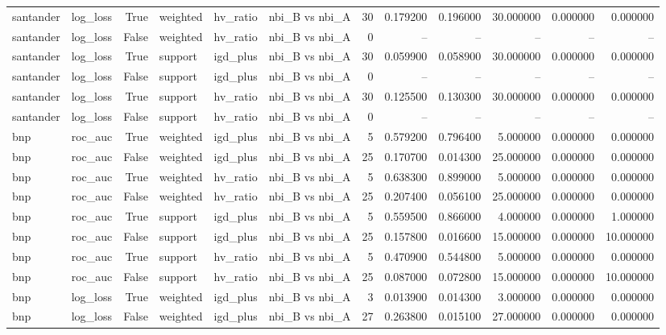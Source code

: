 \begin{longtable}{llrlllrrrrrr}
santander & log\_loss & True & weighted & hv\_ratio & nbi\_B vs nbi\_A & 30 & 0.179200 & 0.196000 & 30.000000 & 0.000000 & 0.000000 \\
santander & log\_loss & False & weighted & hv\_ratio & nbi\_B vs nbi\_A & 0 & -- & -- & -- & -- & -- \\
santander & log\_loss & True & support & igd\_plus & nbi\_B vs nbi\_A & 30 & 0.059900 & 0.058900 & 30.000000 & 0.000000 & 0.000000 \\
santander & log\_loss & False & support & igd\_plus & nbi\_B vs nbi\_A & 0 & -- & -- & -- & -- & -- \\
santander & log\_loss & True & support & hv\_ratio & nbi\_B vs nbi\_A & 30 & 0.125500 & 0.130300 & 30.000000 & 0.000000 & 0.000000 \\
santander & log\_loss & False & support & hv\_ratio & nbi\_B vs nbi\_A & 0 & -- & -- & -- & -- & -- \\
bnp & roc\_auc & True & weighted & igd\_plus & nbi\_B vs nbi\_A & 5 & 0.579200 & 0.796400 & 5.000000 & 0.000000 & 0.000000 \\
bnp & roc\_auc & False & weighted & igd\_plus & nbi\_B vs nbi\_A & 25 & 0.170700 & 0.014300 & 25.000000 & 0.000000 & 0.000000 \\
bnp & roc\_auc & True & weighted & hv\_ratio & nbi\_B vs nbi\_A & 5 & 0.638300 & 0.899000 & 5.000000 & 0.000000 & 0.000000 \\
bnp & roc\_auc & False & weighted & hv\_ratio & nbi\_B vs nbi\_A & 25 & 0.207400 & 0.056100 & 25.000000 & 0.000000 & 0.000000 \\
bnp & roc\_auc & True & support & igd\_plus & nbi\_B vs nbi\_A & 5 & 0.559500 & 0.866000 & 4.000000 & 0.000000 & 1.000000 \\
bnp & roc\_auc & False & support & igd\_plus & nbi\_B vs nbi\_A & 25 & 0.157800 & 0.016600 & 15.000000 & 0.000000 & 10.000000 \\
bnp & roc\_auc & True & support & hv\_ratio & nbi\_B vs nbi\_A & 5 & 0.470900 & 0.544800 & 5.000000 & 0.000000 & 0.000000 \\
bnp & roc\_auc & False & support & hv\_ratio & nbi\_B vs nbi\_A & 25 & 0.087000 & 0.072800 & 15.000000 & 0.000000 & 10.000000 \\
bnp & log\_loss & True & weighted & igd\_plus & nbi\_B vs nbi\_A & 3 & 0.013900 & 0.014300 & 3.000000 & 0.000000 & 0.000000 \\
bnp & log\_loss & False & weighted & igd\_plus & nbi\_B vs nbi\_A & 27 & 0.263800 & 0.015100 & 27.000000 & 0.000000 & 0.000000 \\

\end{longtable}
